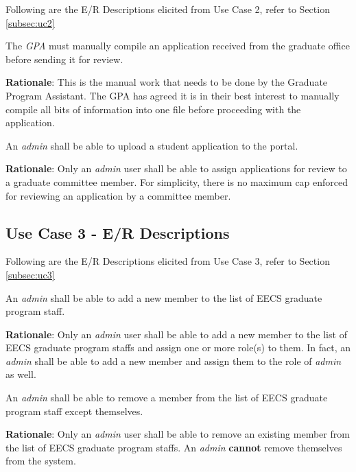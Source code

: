\documentclass[fontsize=12pt,paper=letter,twoside]{scrartcl}
\begin{document}
Following are the E/R Descriptions elicited from Use Case 2, refer to Section \ref{subsec:uc2}

\genenv
{The \emph{GPA} must manually compile an application received from the graduate office before sending it for review. \\}
{}
\label{E3}

\smallskip
\noindent \textbf{Rationale}: This is the manual work that needs to be done by the Graduate Program Assistant. The GPA has agreed it is in their best interest to manually compile all bits of information into one file before proceeding with the application.

\genreq
{An \emph{admin} shall be able to upload a student application to the portal.\\}
{}
\label{R7}

\smallskip
\noindent \textbf{Rationale}: Only an \emph{admin} user shall be able to assign applications for review to a graduate committee member. For simplicity, there is no maximum cap enforced for reviewing an application by a committee member.



\subsection{Use Case 3 - E/R Descriptions}

Following are the E/R Descriptions elicited from Use Case 3, refer to Section \ref{subsec:uc3}

\genreq
{An \emph{admin} shall be able to add a new member to the list of EECS graduate program staff.\\}
{}
\label{R8}

\smallskip
\noindent \textbf{Rationale}: Only an \emph{admin} user shall be able to add a new member to the list of EECS graduate program staffs and assign one or more role(s) to them. In fact, an \emph{admin} shall be able to add a new member and assign them to the role of \emph{admin} as well.

\genreq
{An \emph{admin} shall be able to remove a member from the list of EECS graduate program staff except themselves.\\}
{}
\label{R9}

\smallskip
\noindent \textbf{Rationale}: Only an \emph{admin} user shall be able to remove an existing member from the list of EECS graduate program staffs. An \emph{admin} \textbf{cannot} remove themselves from the system.
\end{document}
